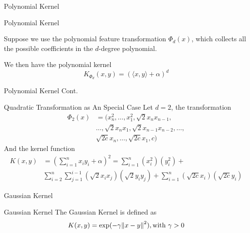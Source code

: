 \documentclass[10pt, compress]{beamer}
\begin{document}
\begin{frame}[fragile]{Polynomial Kernel}

  \begin{block}{Polynomial Kernel}

    Suppose we use the polynomial feature transformation \( \Phi_{d}(x) \), which collects all the possible coefficients in the \(d\)-degree polynomial.

    We then have the polynomial kernel
    \[
      K_{\Phi_{d}}(x, y) = {(\langle x,y \rangle + \alpha)}^{d}
    \]
  \end{block}

\end{frame}

\begin{frame}[fragile]{Polynomial Kernel Cont.}

  \begin{block}{Quadratic Transformation as An Special Case}
    Let \( d=2 \), the transformation
    \begin{align*}
      \Phi_{2}(x) &= (x_{n}^{2}, \dots, x_{1}^{2}, \sqrt{2}x_{n}x_{n-1}, \\
                  &\dots, \sqrt{2}x_{n}x_{1}, \sqrt{2}x_{n-1}x_{n-2}, \dots, \\
                  &\sqrt{2c}x_{n}, \dots, \sqrt{2c}x_{1}, c)
    \end{align*}
    And the kernel function
    \begin{align*}
      K(x, y) &= (\sum_{i=1}^{n} x_{i}y_{i} + \alpha)^{2} = \sum_{i=1}^{n}(x_{i}^{2})(y_{i}^{2}) + \\
              &\sum_{i=2}^{n}\sum_{j=1}^{i-1}(\sqrt{2}x_{i}x_{j})(\sqrt{2}y_{i}y_{j}) + \sum_{i=1}^{n}(\sqrt{2c}x_{i})(\sqrt{2c}y_{i})
    \end{align*}
  \end{block}
\end{frame}


\begin{frame}[fragile]{Gaussian Kernel}

  \begin{block}{Gaussian Kernel}
    The Gaussian Kernel is defined as
    \[
      K(x, y) = \exp(-\gamma{\| x-y \|}^{2}), \text{with \( \gamma > 0\)}
    \]
  \end{block}

\end{frame}
\end{document}
